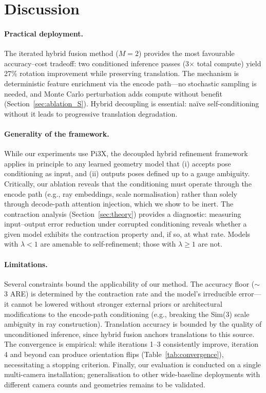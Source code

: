 \section{Discussion}
\label{sec:discussion}

\paragraph{Practical deployment.} The iterated hybrid fusion method ($M=2$) provides the most favourable accuracy--cost tradeoff: two conditioned inference passes (3$\times$ total compute) yield 27\% rotation improvement while preserving translation. The mechanism is deterministic feature enrichment via the encode path---no stochastic sampling is needed, and Monte Carlo perturbation adds compute without benefit (Section~\ref{sec:ablation_S}). Hybrid decoupling is essential: na\"ive self-conditioning without it leads to progressive translation degradation.

\paragraph{Generality of the framework.} While our experiments use Pi3X, the decoupled hybrid refinement framework applies in principle to any learned geometry model that (i) accepts pose conditioning as input, and (ii) outputs poses defined up to a gauge ambiguity. Critically, our ablation reveals that the conditioning must operate through the encode path (e.g., ray embeddings, scale normalisation) rather than solely through decode-path attention injection, which we show to be inert. The contraction analysis (Section~\ref{sec:theory}) provides a diagnostic: measuring input--output error reduction under corrupted conditioning reveals whether a given model exhibits the contraction property and, if so, at what rate. Models with $\lambda < 1$ are amenable to self-refinement; those with $\lambda \geq 1$ are not.

\paragraph{Limitations.} Several constraints bound the applicability of our method. The accuracy floor ($\sim$3\degree{} ARE) is determined by the contraction rate and the model's irreducible error---it cannot be lowered without stronger external priors or architectural modifications to the encode-path conditioning (e.g., breaking the Sim(3) scale ambiguity in ray construction). Translation accuracy is bounded by the quality of unconditioned inference, since hybrid fusion anchors translations to this source. The convergence is empirical: while iterations 1--3 consistently improve, iteration 4 and beyond can produce orientation flips (Table~\ref{tab:convergence}), necessitating a stopping criterion. Finally, our evaluation is conducted on a single multi-camera installation; generalisation to other wide-baseline deployments with different camera counts and geometries remains to be validated.

